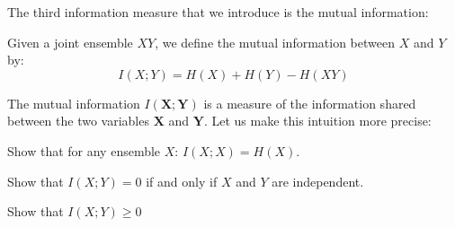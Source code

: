 
The third information measure that we introduce is the mutual information:
\begin{definition}
Given a joint ensemble $XY$, we define the mutual information between $X$ and $Y$ by:
\begin{equation*}
I(X;Y)=H(X) + H(Y) - H(XY)
\end{equation*}
\end{definition}
The mutual information $I(\mathbf{X};\mathbf{Y})$ is a measure of the information shared between the two variables $\mathbf{X}$ and $\mathbf{Y}$. Let us make this intuition more precise:
\begin{exercise}
Show that for any ensemble $X$: $I(X;X)=H(X)$.
\end{exercise}
\begin{exercise}
Show that $I(X;Y)=0$ if and only if $X$ and $Y$ are independent. 
\end{exercise}
\begin{exercise}
Show that $I(X;Y)\geq 0$
\end{exercise}

